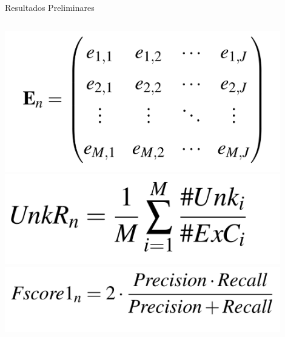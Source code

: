 \documentclass[aspectratio=43,10pt]{beamer}
\begin{document}
\begin{frame}[fragile]{Resultados Preliminares}
  \begin{columns}[T,onlytextwidth]
    \includegraphics[width=0.9\textwidth]{figuras/eq-matrix.png}
    \includegraphics[width=0.9\textwidth]{figuras/eq-unk.png}
    \includegraphics[width=0.9\textwidth]{figuras/eq-fscore1.png}
  \end{columns}
\end{frame}
\end{document}
